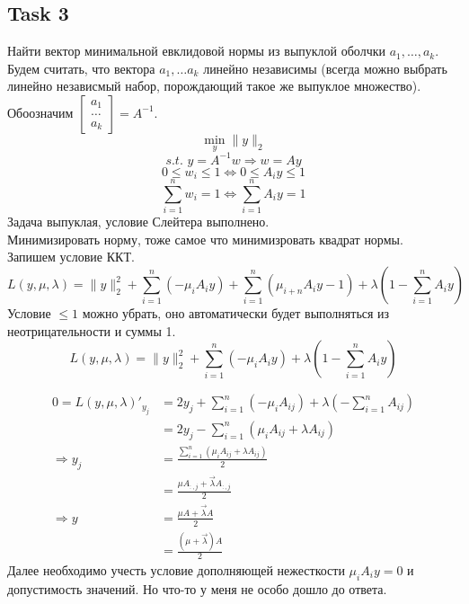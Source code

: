 \documentclass[12pt]{exam}
\begin{document}
\subsection*{Task 3}
Найти вектор минимальной евклидовой нормы из выпуклой оболчки $a_1, \ldots, a_k$.\\
Будем считать, что вектора $a_1, \ldots a_k$ линейно независимы 
(всегда можно выбрать линейно независмый набор, порождающий такое же выпуклое множество).\\
Обоозначим $\begin{bmatrix} a_1 \\ \ldots \\ a_k \end{bmatrix} = A^{-1}$.
$$ \min_y \| y \|_2$$
$$ \textit{s.t. } y = A^{-1} w \Rightarrow w = A y$$
$$ 0 \leq w_i \leq 1 \Leftrightarrow 0 \leq A_i y \leq 1 $$
$$ \sum_{i=1}^n w_i = 1 \Leftrightarrow \sum_{i=1}^n A_i y = 1 $$
Задача выпуклая, условие Слейтера выполнено. \\
Минимизировать норму, тоже самое что минимизровать квадрат нормы.\\
Запишем условие ККТ.
$$ 
L(y, \mu, \lambda) = 
\| y \|_2^2 + 
\sum_{i=1}^n (- \mu_i A_i y) + 
\sum_{i=1}^{n} (\mu_{i+n} A_i y - 1) + 
\lambda \left(1 - \sum_{i=1}^n A_i y \right)
$$
Условие $\leq 1$ можно убрать, оно автоматически будет 
выполняться из неотрицательности и суммы 1. 
$$ 
L(y, \mu, \lambda) = 
\| y \|_2^2 + 
\sum_{i=1}^n (- \mu_i A_i y) + 
\lambda \left(1 - \sum_{i=1}^n A_i y \right)
$$

\begin{align*}
    0 = L(y, \mu, \lambda)'_{y_j} 
        &= 
            2y_j + 
            \sum_{i=1}^n (- \mu_i A_{ij} ) + 
            \lambda \left(-\sum_{i=1}^n A_{ij} \right) \\
        &= 
            2y_j -
            \sum_{i=1}^n (\mu_i A_{ij} + \lambda A_{ij}) \\
    \Rightarrow y_j 
        &= \frac{\sum_{i=1}^n (\mu_i A_{ij} + \lambda A_{ij})}{2} \\
        &= \frac{\mu A_{:,j} + \overrightarrow{\lambda} A_{:,j}}{2} \\
    \Rightarrow y 
        &= \frac{\mu A + \overrightarrow{\lambda} A}{2} \\
        &= \frac{(\mu + \overrightarrow{\lambda}) A }{2} 
\end{align*}
Далее необходимо учесть
условие дополняющей нежесткости $\mu_i A_i y = 0$ и
допустимость значений. 
Но что-то у меня не особо дошло до ответа. 
\end{document}
